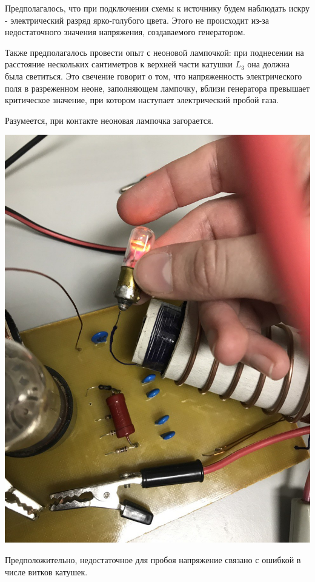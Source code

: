 \documentclass[a4paper,12pt]{article} %
\begin{document}
\noindent Предполагалось, что при подключении схемы к источнику будем наблюдать искру - электрический разряд ярко-голубого цвета. Этого не происходит из-за недостаточного значения напряжения, создаваемого генератором.

\medskip

\noindent Также предполагалось провести опыт с неоновой лампочкой: при поднесении на расстояние нескольких сантиметров к верхней части катушки $L_3$ она должна была светиться. Это свечение говорит о том, что напряженность электрического поля в разреженном неоне, заполняющем лампочку, вблизи генератора превышает критическое значение, при котором наступает электрический пробой газа. 

\medskip

\noindent Разумеется, при контакте неоновая лампочка загорается. 

\medskip
\begin{center}

  \centering
  \includegraphics[scale={0.2}]{неон.jpg}


\end{center}

\noindent Предположительно, недостаточное для пробоя напряжение связано с ошибкой в числе витков катушек.
\end{document}
